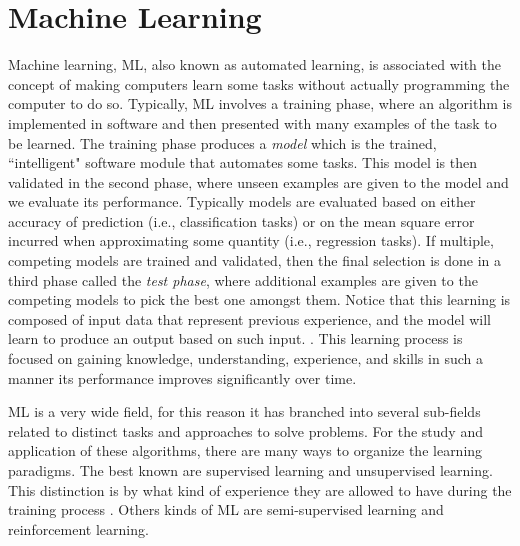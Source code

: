 \documentclass[12pt]{report}
\begin{document}
	\section{Machine Learning}
	
	Machine learning, \ac{ML}, also known as automated learning, is associated with the concept of making computers learn some tasks without actually 
	programming the computer to do so. Typically, \ac{ML} involves a training phase, where an algorithm is implemented in software and then presented
	with many examples of the task to be learned. The training phase produces a {\em model} which is the trained, ``intelligent" software module that automates some tasks. This model is then
	validated in the second phase, where unseen examples are given to the model and we evaluate its performance. 
	Typically models are evaluated based on either accuracy of prediction (i.e., classification tasks)  or on the mean square error incurred when approximating some quantity (i.e., regression tasks). If multiple, competing  models are trained and validated, then the final selection is done in a third phase called the 
	{\em test phase}, where additional examples are given to the competing models to pick the best one amongst them. 
	Notice that this learning is composed of  input data that represent previous experience, and the model will learn to produce an output based on such input.  \cite{Shai2014}. 
	This learning process is focused on gaining knowledge, understanding, experience, and skills \cite{Nilsson1998} in such a manner its performance improves significantly over time.
	
	
	\ac{ML} is a very wide field, for this reason it has branched into several sub-fields related to distinct tasks \cite{Shai2014} and approaches to solve problems. For the study and application of these algorithms,  there are many ways to organize the learning paradigms. The best known are supervised learning and unsupervised learning. This distinction is by what kind of experience they are allowed to have during the training process \cite{Goodfellow2016}. Others kinds of {ML} are semi-supervised learning and reinforcement learning.
	
\end{document}

